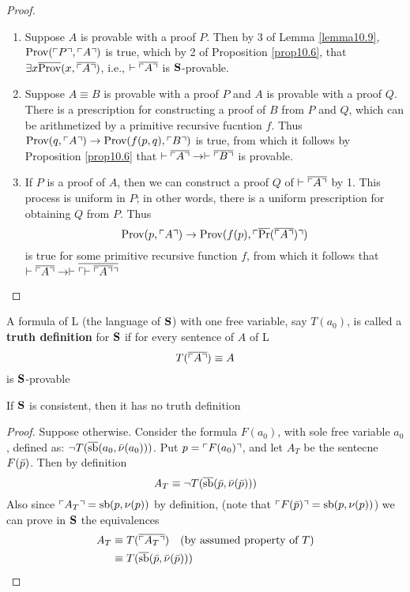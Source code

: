 \documentclass[11pt]{article}
\def \Pr {\text{Pr}}
\def \sb {\text{sb}}
\def \Prov {\text{Prov}}
\newcommand{\ovecor}[1] {\ove{\ucorner{#1}}}
\begin{document}
\begin{proof}
\begin{enumerate}
\item Suppose \(A\) is provable with a proof \(P\). Then by 3 of Lemma \ref{lemma10.9},
\(\Prov(\ucorner{P},\ucorner{A})\) is true, which by 2 of Proposition \ref{prop10.6},
that \(\exists x\ove{\Prov}(x,\ove{\ucorner{A}})\), i.e., \(\vdash\overline{\ulcorner A \urcorner}\) is \(\operatorname{\textbf{S}}\)-provable.
\item Suppose \(A\equiv B\) is provable with a proof \(P\) and \(A\) is provable with a proof \(Q\).
There is a prescription for constructing a proof of \(B\) from \(P\) and \(Q\), which can be
arithmetized by a primitive recursive fucntion \(f\).
Thus \(\Prov(q,\ucorner{A})\to\Prov(f(p,q),\ucorner{B})\) is true, from which it follows by
Proposition \ref{prop10.6} that \(\vdash\overline{\ulcorner A \urcorner}\to\vdash\overline{\ulcorner B \urcorner}\) is
provable.
\item If \(P\) is a proof of \(A\), then we can construct a proof \(Q\) of \(\vdash\ovecor{A}\)
by 1. This process is uniform in \(P\); in other words, there is a uniform prescription for
obtaining \(Q\) from \(P\). Thus
\begin{equation*}
\Prov(p,\ucorner{A})\to\Prov(f(p),\ucorner{\ove{\Pr}(\ovecor{A})})
\end{equation*}
is true for some primitive recursive function \(f\), from which it follows that
\(\vdash\ovecor{A}\to\vdash\ovecor{\vdash \ovecor{A}}\)
\end{enumerate}
\end{proof}

\begin{definition}[]
A formula of L (the language of \(\operatorname{\textbf{S}}\)) with one free variable, say \(T(a_0)\), is called a
\textbf{truth definition} for \(\operatorname{\textbf{S}}\) if for every sentence of \(A\) of L
\begin{equation*}
T(\ovecor{A})\equiv A
\end{equation*}
is \(\operatorname{\textbf{S}}\)-provable
\end{definition}

\begin{theorem}[Tarski]
\label{Problem3}
\label{thm10.11}
If \(\operatorname{\textbf{S}}\) is consistent, then it has no truth definition
\end{theorem}

\begin{proof}
Suppose otherwise. Consider the formula \(F(a_0)\), with sole free variable \(a_0\), defined
as: \(\neg T(\ove{\sb}(a_0,\barnu(a_0)))\). Put \(p=\ulcorner F(a_0) \urcorner\), and let \(A_T\) be the
sentecne \(F(\bar{p})\). Then by definition
\begin{equation*}
A_T\equiv\neg T(\ove{\sb}(\barp,\barnu(\barp)))
\end{equation*}
Also since \(\ucorner{A_T}=\sb(p,\nu(p))\) by definition,
(note that \(\ucorner{F(\barp)}=\sb(p,\nu(p))\))
we can prove in \(\operatorname{\textbf{S}}\) the equivalences
\begin{align*}
A_T&\equiv T(\ovecor{A_T})\quad(\text{by assumed property of $T$})\\
&\equiv T(\ove{\sb}(\barp,\barnu(\barp)))
\end{align*}
\end{proof}
\end{document}
